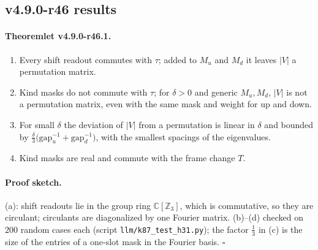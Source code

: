 \subsection*{v4.9.0-r46 results}
\label{subsec:v490-r46-results}

\paragraph{Theoremlet v4.9.0-r46.1.}
\begin{enumerate}[leftmargin=2em]
\item[(a)] Every shift readout commutes with \(\tau\); added to \(M_u\) and \(M_d\) it leaves \(|V|\) a permutation matrix.
\item[(b)] Kind masks do not commute with \(\tau\); for \(\delta>0\) and generic \(M_u,M_d\), \(|V|\) is not a permutation matrix, even with the same
mask and weight for up and down.
\item[(c)] For small \(\delta\) the deviation of \(|V|\) from a permutation is linear in \(\delta\) and bounded by
\(\tfrac{\delta}{3}\bigl(\mathrm{gap}_u^{-1}+\mathrm{gap}_d^{-1}\bigr)\), with the smallest spacings of the eigenvalues.
\item[(d)] Kind masks are real and commute with the frame change \(T\).
\end{enumerate}

\paragraph{Proof sketch.}
(a): shift readouts lie in the group ring \(\mathbb C[\mathbb Z_3]\), which is commutative, so they are circulant; circulants are diagonalized by
one Fourier matrix.  (b)--(d) checked on \(200\) random cases each (script \texttt{llm/k87\_test\_h31.py}); the factor \(\tfrac13\) in (c) is the
size of the entries of a one-slot mask in the Fourier basis.  \(\square\)

